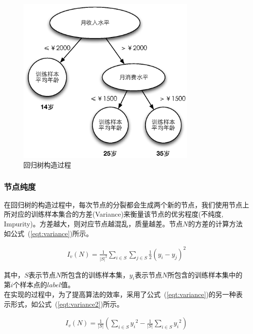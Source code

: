 \documentclass[a4paper,11pt,         %
               ]{article}
\begin{document}
\begin{figure}[htbp]
\centering\includegraphics[width=3.5in]{img/regression_trees.eps}
\caption{回归树构造过程}\label{fig:regression_trees}
\end{figure}

\subsubsection{节点纯度}


在回归树的构造过程中，每次节点的分裂都会生成两个新的节点，我们使用节点上所对应的训练样本集合的方差(Variance)来衡量该节点的优劣程度(不纯度, Impurity)。方差越大，则对应节点越混乱，质量越差。节点$N$的方差的计算方法如公式~(\ref{eqt:variance})所示。

\begin{eqnarray}
	\label{eqt:variance}
{I}_{v}(N)=\frac{1}{{\left|S \right|}^{2}}\sum_{i\in S}\sum_{j\in S}\frac{1}{2}(y_{i}-y_{j})^2
\end{eqnarray}

其中，$S$表示节点$N$所包含的训练样本集，$y_{i}$表示节点$N$所包含的训练样本集中的第$i$个样本点的$label$值。 \\

在实现的过程中，为了提高算法的效率，采用了公式~(\ref{eqt:variance})的另一种表示形式，如公式~(\ref{eqt:variance2})所示。

\begin{eqnarray}
	\label{eqt:variance2}
{I}_{v}(N)=\frac{1}{\left | S \right |}\left ( \sum_{i\in S} {y_{i}}^2 - \frac{1}{\left | S \right |} \sum_{i \in S} {y_{i}}^2 \right )
\end{eqnarray}
\end{document}
